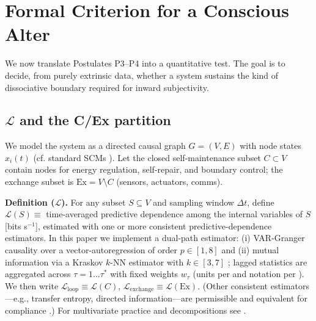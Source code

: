 \documentclass[11pt]{article}
\begin{document}
\section{Formal Criterion for a Conscious Alter}
\label{sec:criterion}
We now translate Postulates P3--P4 into a quantitative test. The goal is to decide, from purely extrinsic data, whether a system sustains the kind of dissociative boundary required for inward subjectivity.

\subsection{$\mathcal{L}$ and the C/Ex partition}
\label{sec:l_partition}

We model the system as a directed causal graph $G = (V, E)$ with node states $x_i(t)$ (cf. standard SCMs \cite{pearl2009causality}). Let the closed self-maintenance subset $C \subset V$ contain nodes for energy regulation, self-repair, and boundary control; the exchange subset is $\text{Ex} = V \setminus C$ (sensors, actuators, comms).

\textbf{Definition ($\mathcal{L}$).} For any subset $S \subseteq V$ and sampling window $\Delta t$, define $\mathcal{L}(S) \equiv$ time-averaged predictive dependence among the internal variables of $S$ [bits s$^{-1}$], estimated with one or more consistent predictive-dependence estimators. In this paper we implement a dual-path estimator: (i) VAR-Granger causality \cite{granger1969investigating,lutkepohl2005new} over a vector-autoregression of order $p \in [1,8]$ and (ii) mutual information via a Kraskov $k$-NN estimator with $k \in [3,7]$ \cite{kraskov2004estimating}; lagged statistics are aggregated across $\tau = 1 \ldots \tau^*$ with fixed weights $w_\tau$ (units per \cite{shannon1949mathematical} and notation per \cite{cover2006elements}). We then write $\mathcal{L}_{\text{loop}} \equiv \mathcal{L}(C)$, $\mathcal{L}_{\text{exchange}} \equiv \mathcal{L}(\text{Ex})$. (Other consistent estimators---e.g., transfer entropy, directed information---are permissible and equivalent for compliance \cite{schreiber2000measuring,massey1990causality}.) For multivariate practice and decompositions see \cite{geweke1982measurement,barnett2014mvgc}.
\end{document}
